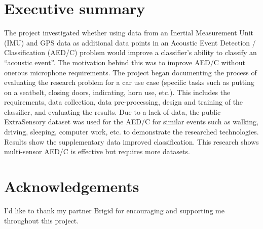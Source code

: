 \documentclass{UoNMCHA}
\numberwithin{equation}{section}
\begin{document}
\section*{Executive summary}
\vspace{-3mm}
The project investigated whether using data from an Inertial Measurement Unit (IMU) and GPS data as additional data points in an Acoustic Event Detection / Classification (AED/C) problem would improve a classifier's ability to classify an “acoustic event”. The motivation behind this was to improve AED/C without onerous microphone requirements. The project began documenting the process of evaluating the research problem for a car use case (specific tasks such as putting on a seatbelt, closing doors, indicating, horn use, etc.). This includes the requirements, data collection, data pre-processing, design and training of the classifier, and evaluating the results. Due to a lack of data, the public ExtraSensory dataset was used for the AED/C for similar events such as walking, driving, sleeping, computer work, etc. to demonstrate the researched technologies. Results show the supplementary data improved classification. This research shows multi-sensor AED/C is effective but requires more datasets.

\vspace{-2mm}
\section*{Acknowledgements}
\vspace{-3mm}
I'd like to thank my partner Brigid for encouraging and supporting me throughout this project. \\
\end{document}
